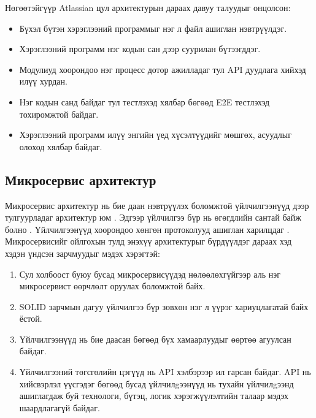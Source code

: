 Нөгөөтэйгүүр Atlassian \cite{atlassian_microservices} цул архитектурын дараах давуу талуудыг онцолсон:
\begin{itemize}
	\item Бүхэл бүтэн хэрэглээний программыг нэг л файл ашиглан нэвтрүүлдэг.
	\item Хэрэглээний программ нэг кодын сан дээр суурилан бүтээгддэг.
	\item Модулиуд хоорондоо нэг процесс дотор ажилладаг тул API дуудлага хийхэд илүү хурдан.
	\item Нэг кодын санд байдаг тул тестлэхэд хялбар бөгөөд E2E тестлэхэд тохиромжтой байдаг.
	\item Хэрэглээний программ илүү энгийн үед хүсэлтүүдийг мөшгөх, асуудлыг олоход хялбар байдаг.
\end{itemize}

\subsection{Микросервис архитектур}
\label{sec:microservices}
Микросервис архитектур нь бие даан нэвтрүүлэх боломжтой үйлчилгээнүүд дээр тулгуурладаг архитектур юм \cite{atlassian_microservices}. Эдгээр үйлчилгээ бүр нь өгөгдлийн сантай байж болно \cite{dragoni2017}. Үйлчилгээнүүд хоорондоо хөнгөн протоколууд ашиглан харилцдаг \cite{blinowski2022}. Микросервисийг ойлгохын тулд энэхүү архитектурыг бүрдүүлдэг дараах хэд хэдэн үндсэн зарчмуудыг мэдэх хэрэгтэй:
\begin{enumerate}
	\item Сул холбоост буюу бусад микросервисүүдэд нөлөөлөхгүйгээр аль нэг микросервист өөрчлөлт оруулах боломжтой байх.
	\item SOLID\cite{blinowski2022} зарчмын дагуу үйлчилгээ бүр зөвхөн нэг л үүрэг хариуцлагатай байх ёстой.
	\item Үйлчилгээнүүд нь бие даасан бөгөөд бүх хамаарлуудыг өөртөө агуулсан байдаг.
	\item Үйлчилгээний төгсгөлийн цэгүүд нь API хэлбэрээр ил гарсан байдаг. API нь хийсвэрлэл үүсгэдэг бөгөөд бусад үйлчилgээнүүд нь тухайн үйлчилgээнд ашиглагдаж буй технологи, бүтэц, логик хэрэгжүүлэлтийн талаар мэдэх шаардлагагүй байдаг.
\end{enumerate}

